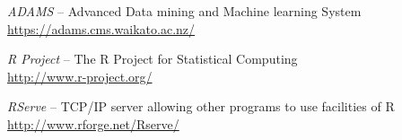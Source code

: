 %

\begin{thebibliography}{999}

		\textit{ADAMS} -- Advanced Data mining and Machine learning System \\
		\url{https://adams.cms.waikato.ac.nz/}{}

	 	\textit{R Project} -- The R Project for Statistical Computing \\
		\url{http://www.r-project.org/}{}

	 	\textit{RServe} -- TCP/IP server allowing other programs to use facilities of R \\
		\url{http://www.rforge.net/Rserve/}{}

\end{thebibliography}
